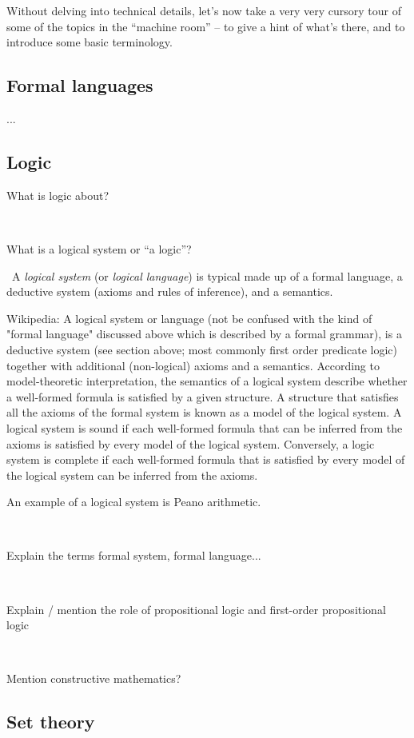 Without delving into technical details, let's now take a very very cursory tour of some of the topics in the ``machine room'' -- to give a hint of what's there, and to introduce some basic terminology.


\subsection{Formal languages}

...

\subsection{Logic}

What is logic about?

\

What is a logical system or ``a logic''?

\
A \emph{logical system} (or \emph{logical language}) is typical made up of a formal language, a deductive system (axioms and rules of inference), and a semantics.


Wikipedia: A logical system or language (not be confused with the kind of "formal language" discussed above which is described by a formal grammar), is a deductive system (see section above; most commonly first order predicate logic) together with additional (non-logical) axioms and a semantics. According to model-theoretic interpretation, the semantics of a logical system describe whether a well-formed formula is satisfied by a given structure. A structure that satisfies all the axioms of the formal system is known as a model of the logical system. A logical system is sound if each well-formed formula that can be inferred from the axioms is satisfied by every model of the logical system. Conversely, a logic system is complete if each well-formed formula that is satisfied by every model of the logical system can be inferred from the axioms.

An example of a logical system is Peano arithmetic.


\

Explain the terms formal system, formal language...

\

Explain / mention the role of propositional logic and first-order propositional logic


\

Mention constructive mathematics?

\subsection{Set theory}

